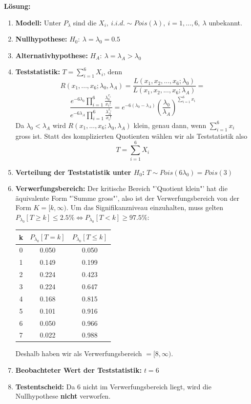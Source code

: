 \documentclass[10pt,a4paper,twocolumn]{article}
\begin{document}
\textbf{Lösung:}
\begin{enumerate}
\item \textbf{Modell:} Unter $P_{\lambda}$ sind die $X_i,\ i.i.d.\sim Pois(\lambda),\ i=1,...,6,\ \lambda$ unbekannt.
\item \textbf{Nullhypothese:} $H_0:\ \lambda =\lambda_0=0.5$
\item \textbf{Alternativhypothese:} $H_A:\ \lambda =\lambda_A >\lambda_0$
\item \textbf{Teststatistik:} $T=\sum\limits_{i=1}^{6}X_i$, denn
\[
R(x_1,...,x_6;\lambda_0,\lambda_A) =
\frac{
	L(x_1,x_2,...,x_6;\lambda_0)
}{
	L(x_1,x_2,...,x_6;\lambda_A)
} =
\]
\[
\frac{
	e^{-6\lambda_0}\prod\limits_{i=1}^{6}\frac{\lambda_{0}^{x_i}}{x_i!}
}{
	e^{-6\lambda_A}\prod\limits_{i=1}^{6}\frac{\lambda_{A}^{x_i}}{x_i!}
} =
e^{-6(\lambda_0-\lambda_A)}\left(\frac{\lambda_0}{\lambda_A}\right)^{\sum\limits_{i=1}^{6}x_i}
\]
Da $\lambda_0<\lambda_A$ wird $R(x_1,...,x_6;\lambda_0,\lambda_A)$ klein, genau dann, wenn $\sum\limits_{i=1}^{6}x_i$ gross ist. Statt des komplizierten Quotienten wählen wir als Teststatistik also
\[
T=\sum\limits_{i=1}^{6}X_i
\]
\item \textbf{Verteilung der Teststatistik unter $H_0$:} $T\sim Pois(6\lambda_0)=Pois(3)$
\item \textbf{Verwerfungsbereich:} Der kritische Bereich "'Quotient klein"' hat die äquivalente Form "'Summe gross"', also ist der Verwerfungsbereich von der Form $K=[k,\infty)$. Um das Signifikanzniveau einzuhalten, muss gelten $P_{\lambda_0}[T\geq k]\leq 2.5\% \Leftrightarrow P_{\lambda_0}[T<k]\geq 97.5\%$:

\begin{center}
  \begin{tabular}{c|c|c}
    k & $P_{\lambda_0}[T=k]$ & $P_{\lambda_0}[T\leq k]$ \\ \hline
    0 & 0.050 & 0.050 \\
    1 & 0.149 & 0.199 \\
    2 & 0.224 & 0.423 \\
    3 & 0.224 & 0.647 \\
    4 & 0.168 & 0.815 \\
    5 & 0.101 & 0.916 \\
    6 & 0.050 & 0.966 \\
    7 & 0.022 & 0.988 \\
  \end{tabular}
\end{center}

Deshalb haben wir als Verwerfungsbereich $=[8,\infty)$.
\item \textbf{Beobachteter Wert der Teststatistik:} $t=6$
\item \textbf{Testentscheid:} Da $6$ nicht im Verwerfungsbereich liegt, wird die Nullhypothese \textbf{nicht} verworfen.


\end{enumerate}
\end{document}

